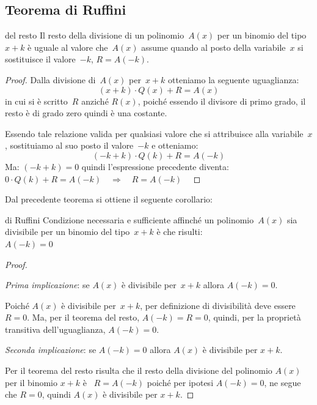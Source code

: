 \subsection{Teorema di Ruffini}
\label{subsec:divpol_teorema_ruffini}

\begin{teorema}{del resto}{}
Il resto della divisione di un polinomio~\(A(x)\) per un
binomio del tipo~\(x+k\) è uguale al valore che~\(A(x)\) assume quando
al posto della variabile~\(x\) si sostituisce il valore~\(-k\), \(R=A(-k)\).
\end{teorema}

\begin{proof}{}{}
Dalla divisione di~\(A(x)\) per~\(x+k\) otteniamo la seguente
uguaglianza:
\[(x+k)\cdot Q(x)+R=A(x)\]
in cui si è scritto~\(R\) anziché \(R(x)\), poiché essendo il divisore di 
primo grado, il resto è di grado zero quindi è una costante.

Essendo tale relazione valida per qualsiasi valore che si attribuisce
alla variabile~\(x\), sostituiamo al suo posto il valore~\(-k\) e otteniamo:
\[(-k+k) \cdot Q(k)+R=A(-k)\]
Ma: \((-k+k)=0\) quindi l'espressione precedente diventa:\\[.5em]
\phantom{.}\hfill 
\(0 \cdot Q(k)+R=A(-k) \quad \Longrightarrow \quad R=A(-k)\) \hfill ~
\end{proof}

Dal precedente teorema si ottiene il seguente corollario:

\begin{teorema}{di Ruffini}{}
Condizione necessaria e sufficiente affinché un polinomio~\(A(x)\) 
sia divisibile per un binomio del tipo~\(x+k\) è
che risulti: \\
\phantom{.}\hfill \(A(-k)=0\) \hfill ~
\end{teorema}

\begin{proof}{}{}
~

\emph{Prima implicazione}: \quad se \(A(x)\) è divisibile 
per~\(x+k\) \quad allora \quad \(A(-k)=0\).

Poiché \(A(x)\) è divisibile per~\(x+k\), per definizione di divisibilità 
deve essere \(R=0\). 
Ma, per il teorema del resto, \(A(-k)=R=0\), 
quindi, per la proprietà transitiva dell'uguaglianza, \(A(-k)=0\).

\noindent \emph{Seconda implicazione}: \quad se \(A(-k)=0\) \quad 
allora \quad \(A(x)\) è divisibile per \(x+k\).

Per il teorema del resto risulta che il resto della divisione del 
polinomio \(A(x)\) per il binomio \(x+k\) è ~\(R=A(-k)\) poiché per 
ipotesi \(A(-k)=0\), ne segue che \(R=0\), quindi \(A(x)\) è divisibile 
per \(x+k\).
\end{proof}


